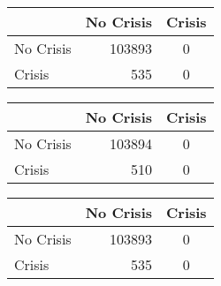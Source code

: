 \begin{table}
    \begin{center}
        \begin{subtable}[c]{0.4\textwidth}
            \begin{tabular}{lrc}
                \hline
                 & No Crisis & Crisis \\
                \hline
                No Crisis & 103893 & 0 \\
                Crisis & 535 & 0\\
                \hline
            \end{tabular}
            \label{tab:mat-conf-raw-test-1.7}
        \end{subtable}
        \hspace{1em}\vspace{1em}
        \begin{subtable}[c]{0.4\textwidth}
                \begin{tabular}{lrc}
                \hline
                 & No Crisis & Crisis \\
                \hline
                No Crisis & 103894 & 0 \\
                Crisis & 510 & 0\\
                \hline
            \end{tabular}
            \label{tab:mat-conf-stats-test-1.7}
        \end{subtable}
        \begin{subtable}[c]{0.4\textwidth}
            \begin{tabular}{lrc}
                \hline
                 & No Crisis & Crisis \\
                \hline
                No Crisis & 103893 & 0 \\
                Crisis & 535 & 0\\
                \hline
            \end{tabular}
            \label{tab:mat-conf-raw-test-1.8}
        \end{subtable}
        \hspace{1em}\vspace{1em}
        \begin{subtable}[c]{0.4\textwidth}
                \begin{tabular}{lrc}
                \hline

\end{tabular}
\end{subtable}
\end{center}
\end{table}
